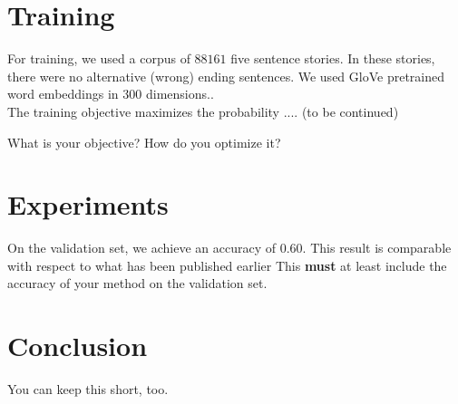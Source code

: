 \documentclass{article}
\begin{document}
\section{Training}
For training, we used a corpus of $88161$ five sentence stories. In these stories, there were no alternative (wrong) ending sentences. 
We used GloVe pretrained word embeddings in 300 dimensions.\cite{pennington2014glove}. \\[.1cm]
The training objective maximizes the probability .... (to be continued)

What is your objective? How do you optimize it?

\section{Experiments}
On the validation set, we achieve an accuracy of $0.60$. This result is comparable with respect to what has been published earlier \cite{}
This {\bf must} at least include the accuracy of your method on the validation set.
\section{Conclusion}
You can keep this short, too.

%
 
\end{document}
